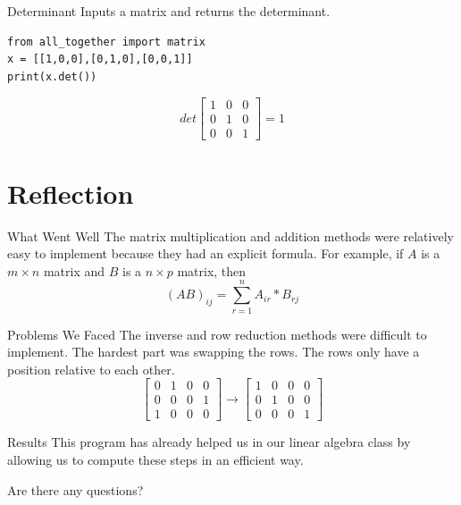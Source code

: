 \documentclass{beamer}
\begin{document}
\begin{frame}[fragile = singleslide]{Determinant}
    Inputs a matrix and returns the determinant. 
\begin{verbatim}
from all_together import matrix    
x = [[1,0,0],[0,1,0],[0,0,1]]
print(x.det()) 
\end{verbatim}
\begin{equation*}
    det \left[
    \begin{array}{ccc}
        1 & 0 &0 \\
        0 &1&0 \\
        0&0&1 
    \end{array}
    \right] = 1
\end{equation*}
\end{frame}


\section{Reflection}
\begin{frame}{What Went Well}
    The matrix multiplication and addition methods were relatively easy to implement because they had an explicit formula. For example, if \(A\) is a \(m \times n\) matrix and \(B\) is a \(n \times p\) matrix, then
    \begin{equation}
        (AB)_{ij} = \sum^{n}_{r=1}A_{ir}*B_{rj}
    \end{equation}
\end{frame}

\begin{frame}{Problems We Faced}
    The inverse and row reduction methods were difficult to implement. The hardest part was swapping the rows. The rows only have a position relative to each other. 
    \begin{equation*}
    \left[
        \begin{array}{cccc}
            0 & 1&0&0  \\
            0 & 0&0&1 \\
            1&0&0&0
        \end{array}
    \right]
    \rightarrow
    \left[
    \begin{array}{cccc}
        1 &0&0&0  \\
         0&1&0&0\\
         0&0&0&1
    \end{array}
    \right]
    \end{equation*}
\end{frame}

\begin{frame}{Results}
    This program has already helped us in our linear algebra class by allowing us to compute these steps in an efficient way. \pause
\begin{center}
    Are there any questions?
\end{center}

\end{frame}
\end{document}
